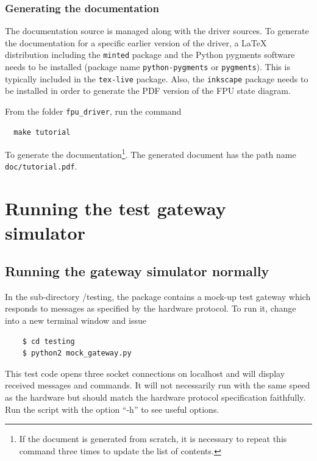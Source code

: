 \documentclass[11pt,a4paper]{scrartcl}
\begin{document}
\subsubsection{Generating the documentation}

The documentation source is managed along with the driver sources.  To
generate the documentation for a specific earlier version of the
driver, a \LaTeX{} distribution including the \texttt{minted} package
and the Python pygments software needs to be installed (package name
\texttt{python-pygments} or \texttt{pygments}).  This is typically
included in the \texttt{tex-live} package. Also, the \texttt{inkscape}
package needs to be installed in order to generate the PDF version of
the FPU state diagram.

From the folder \texttt{fpu\_driver}, run the
command

\begin{verbatim}
  make tutorial
\end{verbatim}

To generate the documentation\footnote{If the document is generated
  from scratch, it is necessary to repeat this command three times to
  update the list of contents.}. The generated document has the path
name \texttt{doc/tutorial.pdf}.


\section{Running the test gateway simulator} 
\subsection{Running the gateway simulator normally}
In the sub-directory /testing, the package contains a mock-up test
gateway which responds to messages as specified by the hardware
protocol. To run it, change into a new terminal window and
issue

  \begin{verbatim}
    $ cd testing
    $ python2 mock_gateway.py
  \end{verbatim}    


This test code opens three socket connections on localhost and will
display received messages and commands. It will not necessarily run
with the same speed as the hardware but should match the hardware
protocol specification faithfully. Run the script with the option
``-h'' to see useful options.
\end{document}
